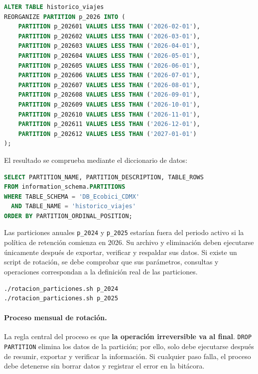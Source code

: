 \documentclass[10pt,a4paper]{article}
\begin{document}
\begin{lstlisting}[language=SQL, caption={División de la partición de 2026 en meses}]
ALTER TABLE historico_viajes
REORGANIZE PARTITION p_2026 INTO (
    PARTITION p_202601 VALUES LESS THAN ('2026-02-01'),
    PARTITION p_202602 VALUES LESS THAN ('2026-03-01'),
    PARTITION p_202603 VALUES LESS THAN ('2026-04-01'),
    PARTITION p_202604 VALUES LESS THAN ('2026-05-01'),
    PARTITION p_202605 VALUES LESS THAN ('2026-06-01'),
    PARTITION p_202606 VALUES LESS THAN ('2026-07-01'),
    PARTITION p_202607 VALUES LESS THAN ('2026-08-01'),
    PARTITION p_202608 VALUES LESS THAN ('2026-09-01'),
    PARTITION p_202609 VALUES LESS THAN ('2026-10-01'),
    PARTITION p_202610 VALUES LESS THAN ('2026-11-01'),
    PARTITION p_202611 VALUES LESS THAN ('2026-12-01'),
    PARTITION p_202612 VALUES LESS THAN ('2027-01-01')
);
\end{lstlisting}

El resultado se comprueba mediante el diccionario de datos:

\begin{lstlisting}[language=SQL, caption={Verificación de particiones}]
SELECT PARTITION_NAME, PARTITION_DESCRIPTION, TABLE_ROWS
FROM information_schema.PARTITIONS
WHERE TABLE_SCHEMA = 'DB_Ecobici_CDMX'
  AND TABLE_NAME = 'historico_viajes'
ORDER BY PARTITION_ORDINAL_POSITION;
\end{lstlisting}

Las particiones anuales \texttt{p\_2024} y \texttt{p\_2025} estarían fuera del periodo activo si la política de retención comienza en 2026. Su archivo y eliminación deben ejecutarse únicamente después de exportar, verificar y respaldar sus datos. Si existe un script de rotación, se debe comprobar que sus parámetros, consultas y operaciones correspondan a la definición real de las particiones.

\begin{lstlisting}[language=bash, caption={Ejemplo de ejecución manual de rotación}]
./rotacion_particiones.sh p_2024
./rotacion_particiones.sh p_2025
\end{lstlisting}

\paragraph{Proceso mensual de rotación.}
La regla central del proceso es que \textbf{la operación irreversible va al final}. \texttt{DROP PARTITION} elimina los datos de la partición; por ello, solo debe ejecutarse después de resumir, exportar y verificar la información. Si cualquier paso falla, el proceso debe detenerse sin borrar datos y registrar el error en la bitácora.
\end{document}
